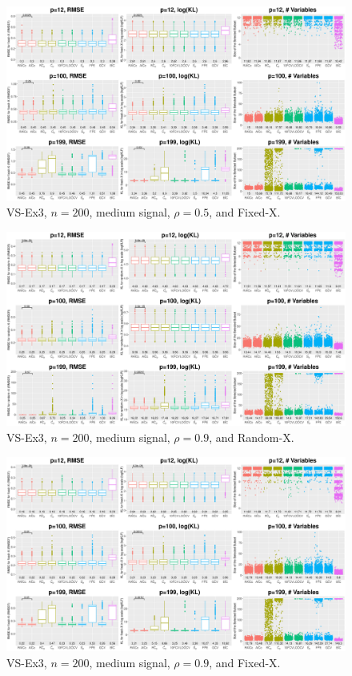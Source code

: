 \begin{figure}[!ht]
\centering
\includegraphics[width=\textwidth]{figures/supplement/fixedx_VS-Ex3_n200_msnr_rho05.eps}
\caption{VS-Ex3, $n=200$, medium signal, $\rho=0.5$, and Fixed-X.}
\end{figure}
\clearpage
\begin{figure}[!ht]
\centering
\includegraphics[width=\textwidth]{figures/supplement/randomx_VS-Ex3_n200_msnr_rho09.eps}
\caption{VS-Ex3, $n=200$, medium signal, $\rho=0.9$, and Random-X.}
\end{figure}
\begin{figure}[!ht]
\centering
\includegraphics[width=\textwidth]{figures/supplement/fixedx_VS-Ex3_n200_msnr_rho09.eps}
\caption{VS-Ex3, $n=200$, medium signal, $\rho=0.9$, and Fixed-X.}
\end{figure}
